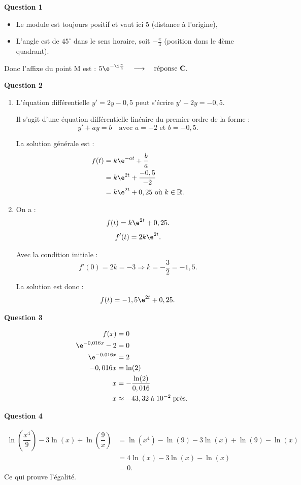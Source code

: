 \bigskip

\textbf{Question 1}

\medskip

\begin{itemize}[label=\textbullet]
\item Le module est toujours positif et vaut ici $5$ (distance à l'origine),
\item L'angle est de $45^\circ$ dans le sens horaire, soit $-\frac{\pi}{4}$ (position dans le 4ème quadrant).
\end{itemize}

Donc l'affixe du point M est :
$5\e^{-\i\frac{\pi}{4}} \quad \longrightarrow \quad \text{réponse \textbf{C}.}$

\bigskip

\textbf{Question 2}

\medskip

\begin{enumerate}
    \item L'équation différentielle $y' = 2y - 0,5$ peut s'écrire $y' - 2y = - 0,5$.
    
    Il s'agit d'une équation différentielle linéaire du premier ordre de la forme :
\[y' + ay = b \quad \text{avec } a = -2 \text{ et } b = -0,5.\]

La solution générale est :
\begin{align*}
f(t) &= k\e^{-at} + \dfrac{b}{a} \\
&= k\e^{2t} + \dfrac{-0,5}{-2} \\
&= k\e^{2t} + 0,25 \text{ où } k \in \mathbb{R}.
\end{align*}

    \item On a :
\[f(t) = k\e^{2t} + 0,25.\]
\[f'(t) = 2k\e^{2t}.\]

Avec la condition initiale :
\[f'(0) = 2k = -3 \Rightarrow k = -\dfrac{3}{2} = -1,5.\]

La solution est donc :
\[f(t) = -1,5\e^{2t} + 0,25.\]
\end{enumerate}

\bigskip

\textbf{Question 3}

\begin{align*}
f(x) &= 0 \\
\e^{-0,016x} - 2 &= 0 \\
\e^{-0,016x} &= 2 \\
-0,016x &= \ln(2) \\
x &= -\dfrac{\ln(2)}{0,016} \\
x &\approx -43,32 \; \text{à} \; 10^{-2} \; \text{près.}
\end{align*}

\bigskip

\textbf{Question 4}

\begin{align*}
\ln\left(\dfrac{x^4}{9}\right) - 3 \ln(x) + \ln\left(\dfrac{9}{x}\right) 	&= \ln(x^4) - \ln(9) - 3 \ln(x) + \ln(9) - \ln(x) \\
&= 4\ln(x) - 3 \ln(x) - \ln(x) \\
&= 0.
\end{align*}
Ce qui prouve l'égalité.

\bigskip
